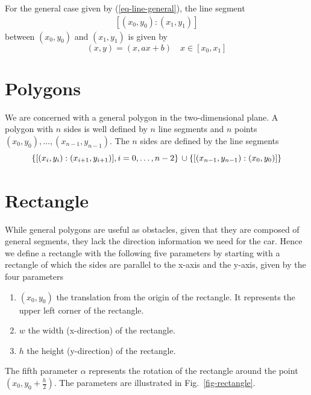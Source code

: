 \documentclass[11pt]{article}
\newcommand{\eqn}[1]{(\ref{#1})}
\newcommand{\figref}[1]{Fig.~\eqref{#1}}
\begin{document}
For the general case given by \eqn{eq-line-general}, the line segment 
\begin{gather*}
    \left[(x_0, y_0):(x_1, y_1)\right]
\end{gather*}
between $(x_0, y_0)$ and $(x_1, y_1)$ is given by
\begin{equation}
    (x, y) = (x, ax + b)\quad x\in [x_0, x_1]
\end{equation}

\section{Polygons}
\label{sec-polygons}

We are concerned with a general polygon in the two-dimensional plane. A polygon
with $n$ sides is well defined by $n$ line segments and $n$ points $(x_0,
y_0),\ldots,(x_{n-1}, y_{n-1})$. The $n$ sides are defined by the line segments
\begin{equation}
    \left\{[(x_i, y_i):(x_{i+1}, y_{i+1})], i=0,\ldots,n-2\right\}\\
\cup\left\{[(x_{n-1}, y_{n-1}):(x_{0}, y_{0})]\right\}
\end{equation}

\section{Rectangle}
\label{sec-rectangle}
While general polygons are useful as obstacles, given that they are composed of
general segments, they lack the direction information we need for the car.
Hence we define a rectangle with the following five parameters by starting with
a rectangle of which the sides are parallel to the x-axis and the y-axis, given
by the four parameters
\begin{enumerate}
    \item $(x_0, y_0)$ the translation from the origin of the rectangle. It
        represents the upper left corner of the rectangle.
    \item $w$ the width (x-direction) of the rectangle.
    \item $h$ the height (y-direction) of the rectangle.
\end{enumerate}
The fifth parameter $\alpha$ represents the rotation of the rectangle around
the point $\left(x_0, y_0 + \frac{h}{2}\right)$. The parameters are illustrated
in \figref{fig-rectangle}.
\end{document}
